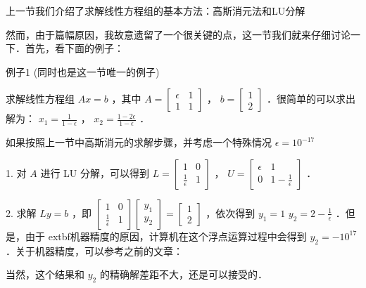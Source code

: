 
\begin{issues}
\issueDraft
\end{issues}

上一节我们介绍了求解线性方程组的基本方法：高斯消元法和LU分解

然而，由于篇幅原因，我故意遗留了一个很关键的点，这一节我们就来仔细讨论一下．首先，看下面的例子：

例子1 (同时也是这一节唯一的例子)

求解线性方程组  $Ax=b$  ，其中  $A=\begin{bmatrix} \epsilon & 1\\ 1 & 1 \end{bmatrix}$  ，  $b=\begin{bmatrix}  1\\  2 \end{bmatrix}$  ．很简单的可以求出解为：  $x_1=\frac{1}{1-\epsilon}$  ， $x_2=\frac{1-2\epsilon}{1-\epsilon}$  ．

如果按照上一节中高斯消元的求解步骤，并考虑一个特殊情况  $\epsilon=10^{-17}$  

    1. 对  $A$  进行 LU 分解，可以得到  $L=\begin{bmatrix} 1& 0\\ \frac{1}{\epsilon} & 1 \end{bmatrix}$  ，  $U=\begin{bmatrix} \epsilon & 1\\ 0 & 1-\frac{1}{\epsilon} \end{bmatrix}$  ．

    2. 求解  $Ly=b$  ，即  $\begin{bmatrix} 1& 0\\ \frac{1}{\epsilon} & 1 \end{bmatrix} \begin{bmatrix} y_1\\ y_2 \end{bmatrix}= \begin{bmatrix} 1\\ 2 \end{bmatrix}$  ，依次得到  $y_1=1$   $y_2=2-\frac{1}{\epsilon}$  ．但是，由于	extbf{机器精度}的原因，计算机在这个浮点运算过程中会得到  $y_2=-10^{17}$  ．关于机器精度，可以参考之前的文章：

当然，这个结果和  $y_2$  的精确解差距不大，还是可以接受的．   

